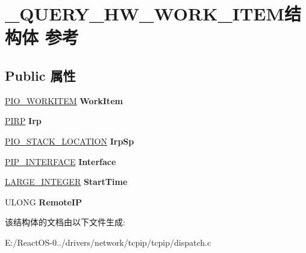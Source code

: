 \hypertarget{struct___q_u_e_r_y___h_w___w_o_r_k___i_t_e_m}{}\section{\+\_\+\+Q\+U\+E\+R\+Y\+\_\+\+H\+W\+\_\+\+W\+O\+R\+K\+\_\+\+I\+T\+E\+M结构体 参考}
\label{struct___q_u_e_r_y___h_w___w_o_r_k___i_t_e_m}
\subsection*{Public 属性}
\begin{DoxyCompactItemize}
\item 
\mbox{\label{struct___q_u_e_r_y___h_w___w_o_r_k___i_t_e_m_a26e0b75fedc4c910ec896330e238fcaa}} 
\hyperlink{struct___i_o___w_o_r_k_i_t_e_m}{P\+I\+O\+\_\+\+W\+O\+R\+K\+I\+T\+EM} {\bfseries Work\+Item}
\item 
\mbox{\label{struct___q_u_e_r_y___h_w___w_o_r_k___i_t_e_m_abbac0ba3c818a153777ab830f8a5c392}} 
\hyperlink{interfacevoid}{P\+I\+RP} {\bfseries Irp}
\item 
\mbox{\label{struct___q_u_e_r_y___h_w___w_o_r_k___i_t_e_m_a2c98a1d79932a85f8806bbbc6f4646ae}} 
\hyperlink{struct___i_o___s_t_a_c_k___l_o_c_a_t_i_o_n}{P\+I\+O\+\_\+\+S\+T\+A\+C\+K\+\_\+\+L\+O\+C\+A\+T\+I\+ON} {\bfseries Irp\+Sp}
\item 
\mbox{\label{struct___q_u_e_r_y___h_w___w_o_r_k___i_t_e_m_aa512c5ec34653bf17db2eabf1b431d65}} 
\hyperlink{struct___i_p___i_n_t_e_r_f_a_c_e}{P\+I\+P\+\_\+\+I\+N\+T\+E\+R\+F\+A\+CE} {\bfseries Interface}
\item 
\mbox{\label{struct___q_u_e_r_y___h_w___w_o_r_k___i_t_e_m_a8cd3b457dada40b665b2b5e10e131ef2}} 
\hyperlink{union___l_a_r_g_e___i_n_t_e_g_e_r}{L\+A\+R\+G\+E\+\_\+\+I\+N\+T\+E\+G\+ER} {\bfseries Start\+Time}
\item 
\mbox{\label{struct___q_u_e_r_y___h_w___w_o_r_k___i_t_e_m_a8071a22497e81ba4bf7b4baa1d47f46e}} 
U\+L\+O\+NG {\bfseries Remote\+IP}
\end{DoxyCompactItemize}


该结构体的文档由以下文件生成\+:\begin{DoxyCompactItemize}
\item 
E\+:/\+React\+O\+S-\/0../drivers/network/tcpip/tcpip/dispatch.\+c\end{DoxyCompactItemize}
